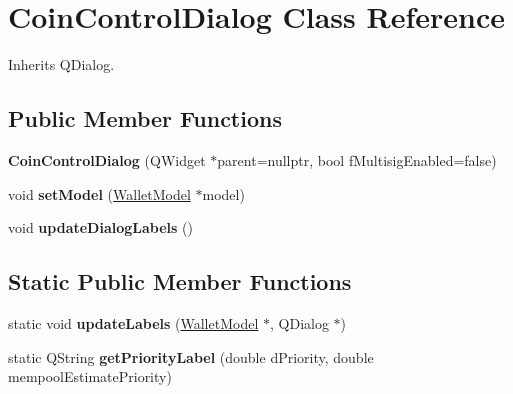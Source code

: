 \hypertarget{class_coin_control_dialog}{}\section{Coin\+Control\+Dialog Class Reference}
\label{class_coin_control_dialog}


Inherits Q\+Dialog.

\subsection*{Public Member Functions}
\begin{DoxyCompactItemize}
\item 
\mbox{\label{class_coin_control_dialog_a8eafb58ed1c5668af9a4890704136671}} 
{\bfseries Coin\+Control\+Dialog} (Q\+Widget $\ast$parent=nullptr, bool f\+Multisig\+Enabled=false)
\item 
\mbox{\label{class_coin_control_dialog_a4c34a48574814089c54f763a22f5317a}} 
void {\bfseries set\+Model} (\mbox{\hyperlink{class_wallet_model}{Wallet\+Model}} $\ast$model)
\item 
\mbox{\label{class_coin_control_dialog_ae0162e01893a3c85aeeee743c1cb1084}} 
void {\bfseries update\+Dialog\+Labels} ()
\end{DoxyCompactItemize}
\subsection*{Static Public Member Functions}
\begin{DoxyCompactItemize}
\item 
\mbox{\label{class_coin_control_dialog_a4fc60e89b097952ff22dc0f9c58c87d9}} 
static void {\bfseries update\+Labels} (\mbox{\hyperlink{class_wallet_model}{Wallet\+Model}} $\ast$, Q\+Dialog $\ast$)
\item 
\mbox{\label{class_coin_control_dialog_a82c553c068d383edb52e2c239642d8e4}} 
static Q\+String {\bfseries get\+Priority\+Label} (double d\+Priority, double mempool\+Estimate\+Priority)
\end{DoxyCompactItemize}
